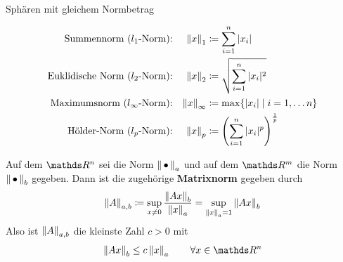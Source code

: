 \begin{Wdhe}[Normen]~
  \label{3.2.3}
  \begin{image}{Sphären mit gleichem Normbetrag}
  \end{image}
  
  \begin{align*}
    \text{Summennorm ($l_1$-Norm):} 
    && \nn[x]_1 &\coloneqq \sum_{i=1}^{n}|x_i| 
                  \index{Norm!Summennorm}\\
    \text{Euklidische Norm ($l_2$-Norm):} 
    && \nn[x]_2 &\coloneqq \sqrt{\sum_{i=1}^{n}|x_i|^2}
                  \index{Norm!Euklidische Norm} \\
    \text{Maximumsnorm ($l_\infty$-Norm):} 
    && \nn[x]_\infty &\coloneqq \max\{|x_i| \mid i=1, \ldots n\}
                       \index{Norm!Maximumsnorm} \\
    \text{Hölder-Norm ($l_p$-Norm):} 
    && \nn[x]_p &\coloneqq \left(\sum_{i=1}^{n}|x_i|^p\right)^{\frac{1}{p}} 
                  \index{Norm!Hölder-Norm}
  \end{align*}
\end{Wdhe}



\begin{Defe}\label{3.2.4}
  Auf dem $\R^n$  sei die Norm $\nn_a$ und auf dem $\R^m$ die Norm $\nn_b$ gegeben.
  Dann ist die zugehörige \textbf{Matrixnorm} 
  gegeben durch
  \begin{gather}
    \nn[A]_{a,b} \coloneqq \sup_{x\neq 0} \frac{\nn[Ax]_b}{\nn[x]_a}
    = \sup_{\nn[x]_a=1} \nn[Ax]_b \label{III.2.1} 
  \end{gather}
  Also ist   $\nn[A]_{a,b}$ die kleinste Zahl $c>0$ mit
  \begin{gather*}
    \nn[Ax]_b  \leq c\nn[x]_a \quad\quad \forall x\in \R^n
  \end{gather*}
\end{Defe}

